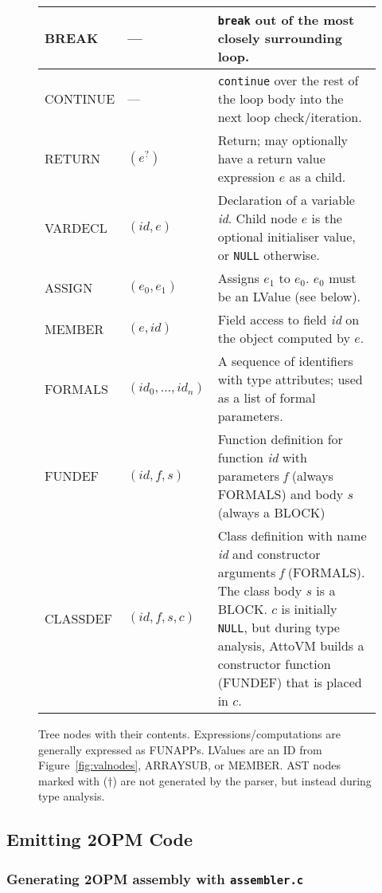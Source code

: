 \documentclass[11pt,a4paper]{article}
\newcommand{\Cpp}[1]{\textcolor{dcyan}{\texttt{#1}}}
\begin{document}
\begin{figure}[h]
\begin{tabular}{|p{2.8cm}|p{2cm}|p{11cm}|}
\hline
\textsf{BREAK}		& ---		& \texttt{break} out of the most closely surrounding loop. \\
\hline
\textsf{CONTINUE} 	& ---		& \texttt{continue} over the rest of the loop body into the next loop check/iteration. \\
\hline
\textsf{RETURN     }	&$(e^?) $ & Return; may optionally have a return value expression $e$ as a child. \\
\hline
\textsf{VARDECL}	& $(\textit{id}, e)$ & Declaration of a variable \textit{id}.  Child node $e$ is the optional initialiser value, or \Cpp{NULL} otherwise. \\
\hline
\textsf{ASSIGN}		& $(e_0, e_1)$  & Assigns  $e_1$ to $e_0$. $e_0$ must be an LValue (see below). \\
\hline
\textsf{MEMBER}		& $(e, \textit{id}) $ & Field access to field \textit{id} on the object computed by $e$. \\ 
\hline
\textsf{FORMALS    }	&$(\textit{id}_0, \ldots, \textit{id}_n)$ & A sequence of identifiers with type attributes; used as a list of formal parameters.\\
\hline
\textsf{FUNDEF     }	&$(\textit{id}, \textit{f}, s)$ & Function definition for function \textit{id} with parameters \textit{f} (always \textsf{FORMALS}) and body $s$ (always a \textsf{BLOCK})\\
\hline
\textsf{CLASSDEF   }	&$(\textit{id}, \textit{f}, s, c)$ & Class definition with name \textit{id} and constructor arguments \textit {f} (\textsf{FORMALS}).  The class body $s$ is a \textsf{BLOCK}.  $c$ is initially \Cpp{NULL}, but during type analysis, AttoVM builds a constructor function (\textsf{FUNDEF}) that is placed in $c$.\\
\hline
\end{tabular}
\caption{Tree nodes with their contents.
  Expressions/computations are generally expressed as \textsf{FUNAPP}s.  LValues are
  an \textsf{ID} from Figure~\ref{fig:valnodes}, \textsf{ARRAYSUB}, or \textsf{MEMBER}.  AST nodes marked with ($\dagger$)
  are not generated by the parser, but instead during type analysis.
}\label{fig:rnodes}
\end{figure}


\subsection{Emitting 2OPM Code}\label{a:2omp}

\subsubsection{Generating 2OPM assembly with \texttt{assembler.c}}
\end{document}
